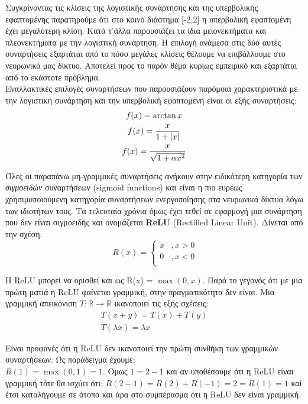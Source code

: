 \documentclass[11pt]{article} %
\numberwithin{equation}{subsection}
\begin{document}
Συγκρίνοντας τις κλίσεις της λογιστικής συνάρτησης και της υπερβολικής εφαπτομένης παρατηρούμε ότι στο κοινό διάστημα [-2,2] η υπερβολική εφαπτομένη έχει μεγαλύτερη κλίση. Κατά τ'άλλα παρουσιάζει τα ίδια μειονεκτήματα και πλεονεκτήματα με την λογιστική συνάρτηση. Η επιλογή ανάμεσα στις δύο αυτές συναρτήσεις εξαρτάται από το πόσο μεγάλες κλίσεις θέλουμε να επιβάλλουμε στο νευρωνικό μας δίκτυο. Αποτελεί προς το παρόν θέμα κυρίως εμπειρικό και εξαρτάται από το εκάστοτε πρόβλημα.\\

Εναλλακτικές επιλογές συναρτήσεων που παρουσιάζουν παρόμοια χαρακτηριστικά με την λογιστική συνάρτηση και την υπερβολική εφαπτομένη είναι οι εξής συναρτήσεις:
\begin{gather*}
f(x) = \arctan{x} \\
f(x) = \frac{x}{1+\abs{x}}\\
f(x) = \frac{x}{\sqrt{1+\alpha x^2}}
\end{gather*}

Όλες οι παραπάνω μη-γραμμικές συναρτήσεις ανήκουν στην ειδικότερη κατηγορία των \textit{σιγμοειδών} συναρτήσεων (sigmoid functions) και είναι η πιο ευρέως χρησιμοποιούμενη κατηγορία συναρτήσεων ενεργοποίησης στα νευρωνικά δίκτυα λόγω των ιδιοτήτων τους. Τα τελευταία χρόνια όμως έχει τεθεί σε εφαρμογή μια συνάρτηση που δεν είναι σιγμοειδής και ονομάζεται \textbf{ReLU} (Rectified Linear Unit). Δίνεται από την σχέση: 
\[ 
\ R(x) = \left\{
\begin{array}{ll}
      x & , x > 0 \\
      0 & , x < 0 \\
\end{array} 
\right. 
\]

Η ReLU μπορεί να ορισθεί και ως R(x) = $\max{(0,x)}$. Παρά το γεγονός ότι με μία πρώτη ματιά η ReLU φαίνεται γραμμική, στην πραγματικότητα δεν είναι. Μια γραμμική απεικόνιση $T : \mathbb{R} \rightarrow \mathbb{R}$ ικανοποιεί τις εξής σχέσεις:
\begin{gather*}
T(x + y) = T(x) + T(y)\\
T(\lambda x) = \lambda x
\end{gather*}

Είναι προφανές ότι η ReLU δεν ικανοποιεί την πρώτη συνθήκη των γραμμικών συναρτήσεων. Ως παράδειγμα έχουμε:\\
$ R(1) = \max{(0,1)} = 1$.
Όμως $1 = 2 - 1$ και αν υποθέσουμε ότι η ReLU είναι γραμμική τότε θα ισχύει ότι:
$R(2 -1) = R(2) + R(-1) = 2 = R(1) = 1$ καί έτσι καταλήγουμε σε άτοπο και άρα στο συμπέρασμα ότι η ReLU δεν είναι γραμμική.
\end{document}
